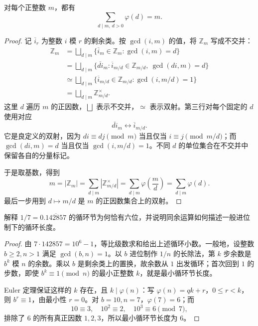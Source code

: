 \documentclass[lang=cn,a4paper,fontset=none,zihao=false,10pt,openany,twoside]{beautybook}
\numberwithin{algorithm}{chapter}
\begin{document}
\begin{proposition}[按最大公因数计数]\label{prop:euler-divisor-sum}
对每个正整数 $m$，都有
\[
 \sum_{d\mid m,\ d>0}\varphi(d)=m.
\]
\end{proposition}
\begin{proof}
记 $\overline i_r$ 为整数 $i$ 模 $r$ 的剩余类。按 $\gcd(i,m)$ 的值，将 $\mathbb Z_m$ 写成不交并：
\[
\begin{aligned}
 \mathbb Z_m
 &=\bigsqcup_{d\mid m}
   \{\overline i_m\in\mathbb Z_m:\gcd(i,m)=d\}\\
 &=\bigsqcup_{d\mid m}
   \{\overline{di}_m:\overline i_{m/d}\in\mathbb Z_{m/d},\
                        \gcd(di,m)=d\}\\
 &\simeq\bigsqcup_{d\mid m}
   \{\overline i_{m/d}\in\mathbb Z_{m/d}:\gcd(i,m/d)=1\}\\
 &=\bigsqcup_{d\mid m}\mathbb Z_{m/d}^{\times}.
\end{aligned}
\]
这里 $d$ 遍历 $m$ 的正因数，$\bigsqcup$ 表示不交并，$\simeq$ 表示双射。第三行对每个固定的 $d$ 使用对应
\[
 \overline{di}_m\longleftrightarrow\overline i_{m/d}.
\]
它是良定义的双射，因为 $di\equiv dj\pmod m$ 当且仅当 $i\equiv j\pmod{m/d}$；而
$\gcd(di,m)=d$ 当且仅当 $\gcd(i,m/d)=1$。不同 $d$ 的单位集合在不交并中保留各自的分量标记。

于是取基数，得到
\[
 m=|\mathbb Z_m|
 =\sum_{d\mid m}|\mathbb Z_{m/d}^{\times}|
 =\sum_{d\mid m}\varphi\!\left(\frac md\right)
 =\sum_{d\mid m}\varphi(d).
\]
最后一步用到 $d\mapsto m/d$ 是 $m$ 的正因数集合上的双射。
\end{proof}

\begin{example}[循环小数与同余]
解释 $1/7=0.\overline{142857}$ 的循环节为何恰有六位，并说明同余运算如何描述一般进位制下的循环长度。
\end{example}
\begin{proof}
由 $7\cdot142857=10^6-1$，等比级数求和给出上述循环小数。一般地，设整数 $b\ge2,n>1$ 满足 $\gcd(b,n)=1$。以 $b$ 进位制作 $1/n$ 的长除法，第 $k$ 步余数是 $b^k$ 模 $n$ 的余数。乘以 $b$ 是剩余类上的置换，故余数从 $1$ 出发循环；首次回到 $1$ 的步数，即使 $b^k\equiv1\pmod n$ 的最小正整数 $k$，就是最小循环节长度。

Euler 定理保证这样的 $k$ 存在，且 $k\mid\varphi(n)$：写 $\varphi(n)=qk+r$，$0\le r<k$，则 $b^r\equiv1$，由最小性 $r=0$。对 $b=10,n=7$，$\varphi(7)=6$；而
\[
 10\equiv3,\quad10^2\equiv2,\quad10^3\equiv6\pmod7,
\]
排除了 $6$ 的所有真正因数 $1,2,3$，所以最小循环节长度为 $6$。
\end{proof}
\end{document}
